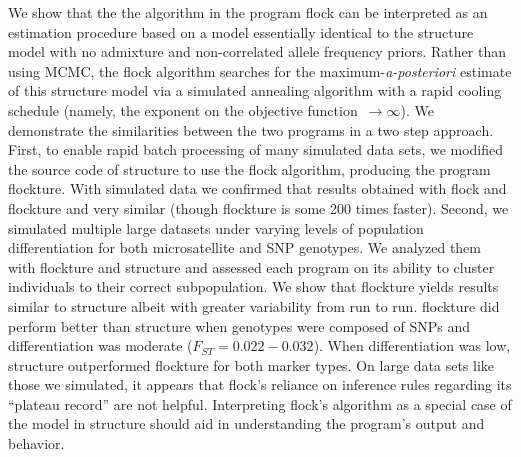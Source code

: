 
      We show that the the algorithm in the program {\sc flock} \citep{Duc&Tur2009} can be
interpreted as an estimation procedure based on 
a model essentially identical to the {\sc structure} 
\citep{Pritchardetal2000} model with no admixture and non-correlated 
allele frequency priors. Rather than using MCMC, the {\sc flock} algorithm 
searches for the maximum-{\em a-posteriori}
estimate of this {\sc structure} model via a simulated 
annealing algorithm with a rapid cooling 
schedule (namely, the exponent on the objective function~$\rightarrow \infty$).  We 
demonstrate the similarities between the two programs in a two step approach. First,
to enable rapid batch processing of many simulated data sets,
we modified the source code of  {\sc structure} to use the {\sc flock} algorithm, producing
the program {\sc flockture}. With simulated data we confirmed that results obtained with
{\sc flock}  and {\sc flockture} and very similar (though flockture is some 200 times faster). 
Second, we simulated multiple large datasets under varying 
levels of population differentiation for both microsatellite and SNP genotypes. We analyzed them
with {\sc flockture} and {\sc structure} and assessed each program on its ability to cluster
individuals to their correct subpopulation.  We show that
{\sc flockture} yields results similar to {\sc structure} albeit with greater 
variability from run to run. {\sc flockture} did perform better than {\sc structure} 
when genotypes were composed of SNPs and differentiation was moderate 
($F_{ST}=0.022-0.032$). When differentiation was low, {\sc structure} outperformed {\sc flockture}
for both marker types. On large data sets like those we simulated, it appears that 
{\sc flock}'s reliance on inference rules regarding its ``plateau record'' are not helpful. 
Interpreting {\sc flock}'s algorithm as a special case of the model in 
{\sc structure} should aid in understanding the program's output and behavior. 

